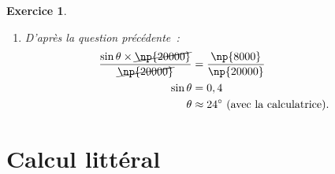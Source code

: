 \documentclass[10pt]{article}
\newtheorem{exo}{Exercice}
\begin{document}
\begin{exo}
\begin{enumerate}
Le remorqueur le plus puissant (en haut) génère une force de ~N sur son câble, le plus petit (en bas) une force de ~N. Donc dans la figure ci-dessus on peut prendre~: \[AF=\np{20000}\qquad,\qquad AC=\np{16000}.\]

Soient $I$ et $H$ les points de la droite $\ell$ tels que $(FI)$ et $(HC)$ soient perpendiculaires à $\ell.$ D'après l'exercice précédent~:
\begin{align*}FI&=\sin \theta\times AF=\sin \theta\times\np{20000},\\
HC&=\sin 30^{\circ}\times AC=\sin 30^{\circ}\times\np{16000}=0,5\times \np{16000}=\np{8000}.
\end{align*}

Comme le navire suit la ligne droite $\ell,$ quand on ajoute les deux forces $\overrightarrow{F_1}$ et $\overrightarrow{F_2},$ on reste sur la ligne $\ell.$ Il s'ensuit que les ordonnées de chacun des deux vecteurs se compensent, c'est-à-dire que $FI=HC.$ On a donc, d'après les deux égalités ci-dessus~:
\[\sin \theta\times\np{20000}=\np{8000}.\]



\item D'après la question précédente~:
\begin{align*}
\frac{\sin \theta\times\cancel{\np{20000}}}{\cancel{\np{20000}}}&=\frac{\np{8000}}{\np{20000}}\\
\sin\theta &=0,4\\
\theta&\approx 24^{\circ}~\text{(avec la calculatrice)}.
\end{align*}
\end{enumerate}

\end{exo}



\setcounter{section}{16}

\section{Calcul littéral}

\setcounter{exo}{188}
\end{document}
